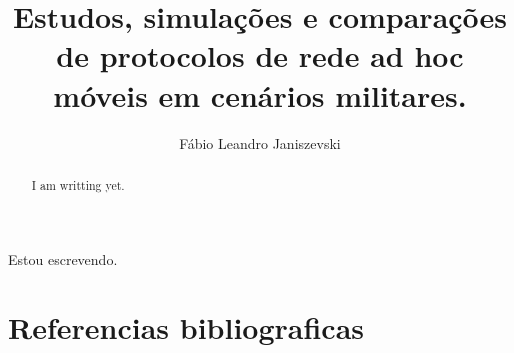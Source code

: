 \documentclass[12pt]{article}
\title{Estudos, simula\c{c}\~oes e compara\c{c}\~oes de protocolos de rede ad hoc m\'oveis em cen\'arios militares.}
\author{F\'abio Leandro Janiszevski\inst{1}}
\begin{document}
\maketitle

\begin{abstract}
I am writting yet.
\end{abstract}

\begin{resumo}
Estou escrevendo.
\end{resumo}



\section{Referencias bibliograficas}



\end{document}
